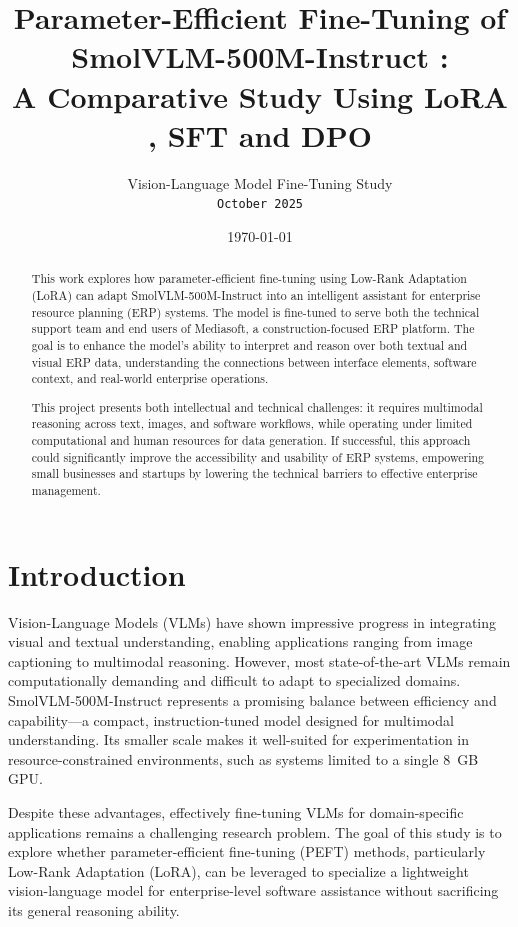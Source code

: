 \documentclass[10pt,conference,compsocconf]{IEEEtran}
\title{\textbf{Parameter-Efficient Fine-Tuning of SmolVLM-500M-Instruct \cite{marafioti2025smolvlm}:\\A Comparative Study Using LoRA \cite{hu2021loralowrankadaptationlarge}, SFT \cite{ouyang2022traininglanguagemodelsfollow} \cite{wei2022finetunedlanguagemodelszeroshot} and DPO \cite{rafailov2024directpreferenceoptimizationlanguage}}}
\author{
    Vision-Language Model Fine-Tuning Study\\
    \texttt{October 2025}
}
\date{\today}
\begin{document}
\maketitle

\begin{abstract}
This work explores how parameter-efficient fine-tuning using Low-Rank Adaptation (LoRA\cite{hu2021loralowrankadaptationlarge}) can adapt SmolVLM-500M-Instruct \cite{marafioti2025smolvlm} into an intelligent assistant for enterprise resource planning (ERP) systems. The model is fine-tuned to serve both the technical support team and end users of Mediasoft, a construction-focused ERP platform. The goal is to enhance the model’s ability to interpret and reason over both textual and visual ERP data, understanding the connections between interface elements, software context, and real-world enterprise operations.

This project presents both intellectual and technical challenges: it requires multimodal reasoning across text, images, and software workflows, while operating under limited computational and human resources for data generation. If successful, this approach could significantly improve the accessibility and usability of ERP systems, empowering small businesses and startups by lowering the technical barriers to effective enterprise management.  
\end{abstract}

\section{Introduction}

Vision-Language Models (VLMs) have shown impressive progress in integrating visual and textual understanding, enabling applications ranging from image captioning to multimodal reasoning. However, most state-of-the-art VLMs remain computationally demanding and difficult to adapt to specialized domains. SmolVLM-500M-Instruct \cite{marafioti2025smolvlm} represents a promising balance between efficiency and capability—a compact, instruction-tuned model designed for multimodal understanding. Its smaller scale makes it well-suited for experimentation in resource-constrained environments, such as systems limited to a single 8~GB GPU.  

Despite these advantages, effectively fine-tuning VLMs for domain-specific applications remains a challenging research problem. The goal of this study is to explore whether parameter-efficient fine-tuning (PEFT) methods, particularly Low-Rank Adaptation (LoRA\cite{hu2021loralowrankadaptationlarge}), can be leveraged to specialize a lightweight vision-language model for enterprise-level software assistance without sacrificing its general reasoning ability.
\end{document}
